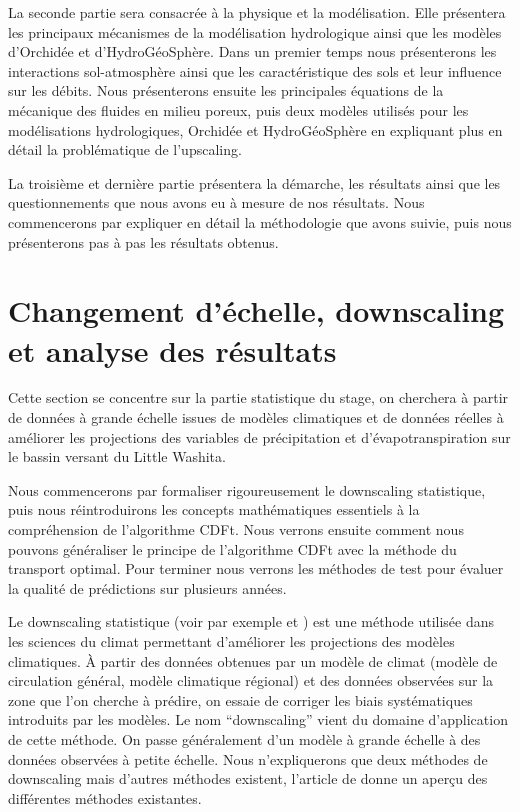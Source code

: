 \documentclass[a4paper,11pt]{article}
\numberwithin{equation}{section}
\begin{document}
La seconde partie sera consacrée à la physique et la modélisation. Elle présentera les principaux mécanismes de la modélisation hydrologique ainsi que les modèles d'Orchidée et d'HydroGéoSphère. Dans un premier temps nous présenterons les interactions sol-atmosphère ainsi que les caractéristique des sols et leur influence sur les débits. Nous présenterons ensuite les principales équations de la mécanique des fluides en milieu poreux, puis deux modèles utilisés pour les modélisations hydrologiques, Orchidée et HydroGéoSphère en expliquant plus en détail la problématique de l'upscaling.

La troisième et dernière partie présentera la démarche, les résultats ainsi que les questionnements que nous avons eu à mesure de nos résultats. Nous commencerons par expliquer en détail la méthodologie que avons suivie, puis nous présenterons pas à pas les résultats obtenus.


\newpage
\section{Changement d'échelle, downscaling et analyse des résultats}
\label{ch:downscaling}
Cette section se concentre sur la partie statistique du stage, on cherchera à partir de données à grande échelle issues de modèles climatiques et de données réelles à améliorer les projections des variables de précipitation et d'évapotranspiration sur le bassin versant du Little Washita. 

Nous commencerons par formaliser rigoureusement le downscaling statistique, puis nous réintroduirons les concepts mathématiques essentiels à la compréhension de l'algorithme CDFt. Nous verrons ensuite comment nous pouvons généraliser le principe de l'algorithme CDFt avec la méthode du transport optimal. Pour terminer nous verrons les méthodes de test pour évaluer la qualité de prédictions sur plusieurs années.

\vspace{0.7cm}

Le downscaling statistique (voir par exemple \cite{vrac2012dynamical} et \cite{ayar2016intercomparison}) est une méthode utilisée dans les sciences du climat permettant d'améliorer les projections des modèles climatiques. À partir des données obtenues par un modèle de climat (modèle de circulation général, modèle climatique régional) et des données observées sur la zone que l'on cherche à prédire, on essaie de corriger les biais systématiques introduits par les modèles. Le nom ``downscaling'' vient du domaine d'application de cette méthode. On passe généralement d'un modèle à grande échelle à des données observées à petite échelle. Nous n'expliquerons que deux méthodes de downscaling mais d'autres méthodes existent, l'article de \cite{ayar2016intercomparison} donne un aperçu des différentes méthodes existantes.
\end{document}
